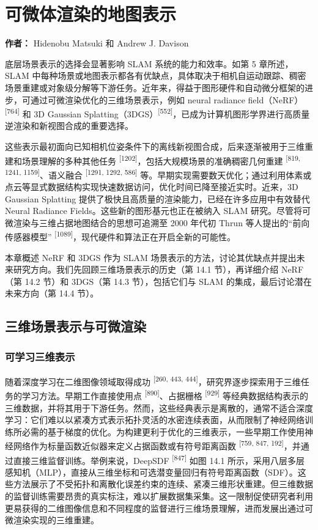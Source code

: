 \chapter{可微体渲染的地图表示}

\textbf{作者：} Hidenobu Matsuki 和 Andrew J. Davison

底层场景表示的选择会显著影响 SLAM 系统的能力和效率。如第 5 章所述，SLAM 中每种场景或地图表示都各有优缺点，具体取决于相机自运动跟踪、稠密场景重建或对象级分解等下游任务。近年来，得益于图形硬件和自动微分框架的进步，可通过可微渲染优化的三维场景表示，例如 neural radiance field（NeRF）\textsuperscript{[764]} 和 3D Gaussian Splatting（3DGS）\textsuperscript{[552]}，已成为计算机图形学界进行高质量逆渲染和新视图合成的重要选择。

这些表示最初面向已知相机位姿条件下的离线新视图合成，后来逐渐被用于三维重建和场景理解的多种其他任务 \textsuperscript{[1202]}，包括大规模场景的准确稠密几何重建 \textsuperscript{[819, 1241, 1159]}、语义融合 \textsuperscript{[1291, 1292, 586]} 等。早期实现需要数天优化；通过利用体素或点云等显式数据结构实现快速数据访问，优化时间已降至接近实时。近来，3D Gaussian Splatting 提供了极快且高质量的渲染能力，已经在许多应用中有效替代 Neural Radiance Fields。这些新的图形基元也正在被纳入 SLAM 研究。尽管将可微渲染与三维占据地图结合的思想可追溯至 2000 年代初 Thrun 等人提出的“前向传感器模型” \textsuperscript{[1089]}，现代硬件和算法正在开启全新的可能性。

本章概述 NeRF 和 3DGS 作为 SLAM 场景表示的方法，讨论其优缺点并提出未来研究方向。我们先回顾三维场景表示的历史（第 14.1 节），再详细介绍 NeRF（第 14.2 节）和 3DGS（第 14.3 节），包括它们与 SLAM 的集成，最后讨论潜在未来方向（第 14.4 节）。

\section{三维场景表示与可微渲染}

\subsection{可学习三维表示}

随着深度学习在二维图像领域取得成功 \textsuperscript{[260, 443, 444]}，研究界逐步探索用于三维任务的学习方法。早期工作直接使用点 \textsuperscript{[890]}、占据栅格 \textsuperscript{[929]} 等经典数据结构表示的三维数据，并将其用于下游任务。然而，这些经典表示是离散的，通常不适合深度学习：它们难以以紧凑方式表示拓扑灵活的水密连续表面，从而限制了神经网络训练所必需的基于梯度的优化。为构建更利于优化的三维表示，一些早期工作使用神经网络作为标量函数近似器来定义占据函数或有符号距离函数 \textsuperscript{[759, 847, 192]}，并通过直接三维监督训练。举例来说，DeepSDF \textsuperscript{[847]} 如图 14.1 所示，采用八层多层感知机（MLP），直接从三维坐标和可选潜变量回归有符号距离函数（SDF）。这些方法展示了不受拓扑和离散化误差约束的连续、紧凑三维形状重建。但三维数据的监督训练需要昂贵的真实标注，难以扩展数据集采集。这一限制促使研究者利用更易获得的二维图像信息和不同程度的监督进行三维场景理解，进而发展出通过可微渲染实现的三维重建。

